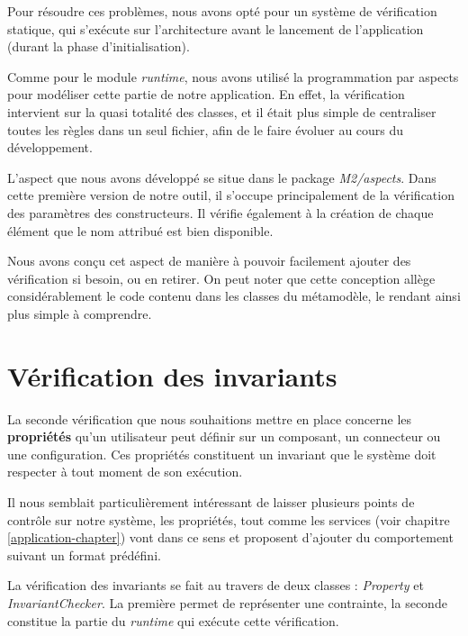         Pour résoudre ces problèmes, nous avons opté pour un système de vérification statique, qui s'exécute sur l'architecture avant le lancement de l'application (durant la phase d'initialisation).
        \newline
        
        Comme pour le module \emph{runtime}, nous avons utilisé la programmation par aspects pour modéliser cette partie de notre application. En effet, la vérification intervient sur la quasi totalité des classes, et il était plus simple de centraliser toutes les règles dans un seul fichier, afin de le faire évoluer au cours du développement.
        \newline
        
        L'aspect que nous avons développé se situe dans le package \emph{M2/aspects}. Dans cette première version de notre outil, il s'occupe principalement de la vérification des paramètres des constructeurs. Il vérifie également à la création de chaque élément que le nom attribué est bien disponible.
        \newline
        
        Nous avons conçu cet aspect de manière à pouvoir facilement ajouter des vérification si besoin, ou en retirer. On peut noter que cette conception allège considérablement le code contenu dans les classes du métamodèle, le rendant ainsi plus simple à comprendre.
    
    \section{Vérification des invariants}
    	La seconde vérification que nous souhaitions mettre en place concerne les \textbf{propriétés} qu'un utilisateur peut définir sur un composant, un connecteur ou une configuration. Ces propriétés constituent un invariant que le système doit respecter à tout moment de son exécution.
        \newline
        
        Il nous semblait particulièrement intéressant de laisser plusieurs points de contrôle sur notre système, les propriétés, tout comme les services (voir chapitre \ref{application-chapter}) vont dans ce sens et proposent d'ajouter du comportement suivant un format prédéfini.
        \newline
        
        La vérification des invariants se fait au travers de deux classes : \emph{Property} et \emph{InvariantChecker}. La première permet de représenter une contrainte, la seconde constitue la partie du \emph{runtime} qui exécute cette vérification.
        
